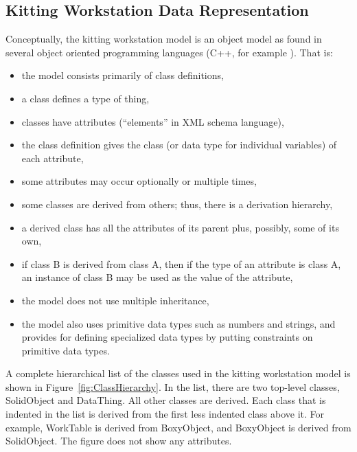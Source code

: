 \subsection{Kitting Workstation Data Representation}
Conceptually, the kitting workstation model is an object model as found in
several object oriented programming languages (C++, for example
\cite{Stroustrup.2000}).  That is:
\begin{itemize}
\item the model consists primarily of class definitions,
\item a class defines a type of thing,
\item classes have attributes (``elements'' in XML schema language),
\item the class definition gives the class (or data type for individual variables) of each attribute,
\item some attributes may occur optionally or multiple times,
\item some classes are derived from others; thus, there is a derivation
 hierarchy,
\item a derived class has all the attributes of its parent plus, possibly,
  some of its own,
\item if class B is derived from class A, then if the type of an attribute
  is class A, an instance of class B may be used as the value of the attribute,
\item the model does not use multiple inheritance,
\item the model also uses primitive data types such as numbers and strings,
  and provides for defining specialized data types by putting constraints
  on primitive data types.
\end{itemize}

A complete hierarchical list of the classes used in the kitting workstation
model is shown in Figure~\ref{fig:ClassHierarchy}. In the list, there are two
top-level classes, SolidObject and DataThing. All other classes are
derived. Each class that is indented in the list is derived from the first
less indented class above it. For example, WorkTable is derived from
BoxyObject, and BoxyObject is derived from SolidObject. The figure does not
show any attributes.

